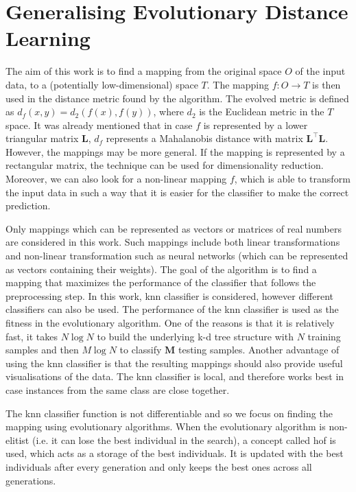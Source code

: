 \documentclass[12pt,a4paper]{report}
\begin{document}

\chapter{Generalising Evolutionary Distance Learning} \label{chap:our-method}

The aim of this work is to find a mapping from the original space $O$ of the input data, to a (potentially low-dimensional) space $T$. The mapping $f: O \to T$ is then used in the distance metric found by the algorithm. The evolved metric is defined as $d_f(x, y) = d_2(f(x), f(y))$, where $d_2$ is the Euclidean metric in the $T$ space. It was already mentioned that in case $f$ is represented by a lower triangular matrix $\bm{L}$, $d_f$ represents a Mahalanobis distance with matrix $\bm{L}^\top\bm{L}$. However, the mappings may be more general. If the mapping is represented by a rectangular matrix, the technique can be used for dimensionality reduction. Moreover, we can also look for a non-linear mapping $f$, which is able to transform the input data in such a way that it is easier for the classifier to make the correct prediction.

Only mappings which can be represented as vectors or matrices of real numbers are considered in this work. Such mappings include both linear transformations and non-linear transformation such as neural networks (which can be represented as vectors containing their weights). The goal of the algorithm is to find a mapping that maximizes the performance of the classifier that follows the preprocessing step. In this work, \ac{knn} classifier is considered, however different classifiers can also be used. The performance of the \ac{knn} classifier is used as the fitness in the evolutionary algorithm. One of the reasons is that it is relatively fast, it takes $N\log{N}$ to build the underlying k-d tree structure with $N$ training samples and then $M \log{N}$ to classify $\bm{M}$ testing samples. Another advantage of using the \ac{knn} classifier is that the resulting mappings should also provide useful visualisations of the data. The \ac{knn} classifier is local, and therefore works best in case instances from the same class are close together.

The \ac{knn} classifier function is not differentiable and so we focus on finding the mapping using evolutionary algorithms. When the evolutionary algorithm is non-elitist (i.e. it can lose the best individual in the search), a concept called \ac{hof} is used, which acts as a storage of the best individuals. It is updated with the best individuals after every generation and only keeps the best ones across all generations.
\end{document}
